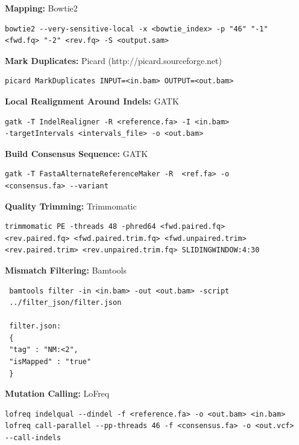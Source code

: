 \documentclass[12pt,twoside]{reedthesis}
\begin{document}
\noindent\textbf{Mapping:} Bowtie2 \citep{langmead_fast_2012}
\begin{lstlisting}
bowtie2 --very-sensitive-local -x <bowtie_index> -p "46" "-1" 
<fwd.fq> "-2" <rev.fq> -S <output.sam>
\end{lstlisting}

\noindent
\textbf{Mark Duplicates:} Picard (http://picard.sourceforge.net)
\begin{lstlisting}
picard MarkDuplicates INPUT=<in.bam> OUTPUT=<out.bam>
\end{lstlisting}

\noindent
\textbf{Local Realignment Around Indels:} GATK \citep{mckenna_genome_2010}
\begin{lstlisting}
gatk -T IndelRealigner -R <reference.fa> -I <in.bam> 
-targetIntervals <intervals_file> -o <out.bam>
\end{lstlisting}

\noindent
\textbf{Build Consensus Sequence:} GATK 
\begin{lstlisting}
gatk -T FastaAlternateReferenceMaker -R  <ref.fa> -o  
<consensus.fa> --variant 
\end{lstlisting}

\noindent
\textbf{Quality Trimming:} Trimmomatic
\begin{lstlisting}
trimmomatic PE -threads 48 -phred64 <fwd.paired.fq> 
<rev.paired.fq> <fwd.paired.trim.fq> <fwd.unpaired.trim> 
<rev.paired.trim> <rev.unpaired.trim.fq> SLIDINGWINDOW:4:30
\end{lstlisting}

\noindent
\textbf{Mismatch Filtering:} Bamtools \citep{barnett_bamtools:_2011}

\begin{lstlisting}
 bamtools filter -in <in.bam> -out <out.bam> -script 
 ../filter_json/filter.json

 filter.json:
 {
 "tag" : "NM:<2",
 "isMapped" : "true"
 }
\end{lstlisting}

\noindent\textbf{Mutation Calling:} LoFreq \citep{wilm_lofreq:_2012}
\begin{lstlisting}
lofreq indelqual --dindel -f <reference.fa> -o <out.bam> <in.bam>
lofreq call-parallel --pp-threads 46 -f <consensus.fa> -o <out.vcf> 
--call-indels
\end{lstlisting}

\newpage
\end{document}

